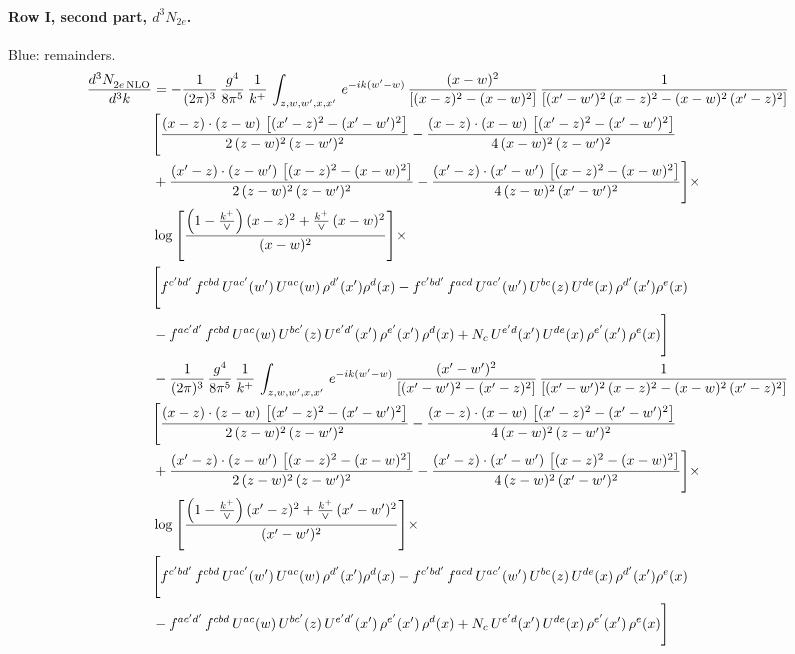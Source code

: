 \documentclass[10pt]{article}
\numberwithin{equation}{section}
\newcommand{\new}[1]{{\color{blue}#1}}
\begin{document}
\paragraph{Row I, second part, $d^3N_{2e}$.}
\new{Blue}: remainders.
\begin{align}
 \frac{d^{3}N_{2e\,\rm NLO}^{\rm}}{d^{3}k}  & =   -\frac{1}{(2\pi)^{3}}\, \frac{g^{4}}{8\pi^{5}}\,\frac{1}{k^{+}}\,\int_{z,w,w^{\prime},x,x'}\, e^{-ik(w^{\prime}-w)}\,\frac{(x-w)^{2}}{\left[(x-z)^{2}-(x-w)^{2}\right]}\, \frac{1}{\left[(x'-w')^{2}\, (x-z)^{2} - (x-w)^{2}\, (x'-z)^{2}\right]} \notag \\ & \Bigg[\frac{(x-z)\cdot (z-w)\, \left[(x'-z)^{2}-(x'-w')^{2}\right]}{2\, (z-w)^{2}\, (z-w')^{2}}  - \frac{(x-z)\cdot (x-w)\,\left[(x'-z)^{2}-(x'-w')^{2}\right] }{4\,(x-w)^{2}\,(z-w')^{2}}\notag \\ & +\frac{(x'-z)\cdot (z-w')\, \left[(x-z)^{2}-(x-w)^{2}\right]}{2\, (z-w)^{2}\, (z-w')^{2}}-\frac{(x'-z)\cdot (x'-w')\, \left[(x-z)^{2}-(x-w)^{2}\right]}{4\, (z-w)^{2}\,(x'-w')^{2}}\Bigg]\times\,\notag \\ & \log{\left[\frac{\left(1-\frac{k^{+}}{\vee}\right)(x-z)^{2}+\frac{k^{+}}{\vee}\,(x-w)^{2}}{(x-w)^{2}}\right]}\times\,\notag \\ & \Bigg[f^{c'bd'}\,f^{cbd}\, U^{ac'}(w')\,U^{ac}(w)\,\rho^{d'}(x')\rho^{d}(x)- f^{c'bd'}\,f^{acd}\,U^{ac'}(w')\,U^{bc}(z)\,U^{de}(x)\,\rho^{d'}(x')\rho^{e}(x) \notag \\ & -f^{ac'd'}\,f^{cbd}\,U^{ac}(w)\,U^{bc'}(z)\,U^{e'd'}(x')\,\rho^{e'}(x')\,\rho^{d}(x) +N_{c}\,U^{e'd}(x')\,U^{de}(x)\,\rho^{e'}(x')\,\rho^{e}(x)\Bigg] \notag \\
& -\frac{1}{(2\pi)^{3}}\, \frac{g^{4}}{8\pi^{5}}\,\frac{1}{k^{+}}\,\int_{z,w,w^{\prime},x,x'}\, e^{-ik(w^{\prime}-w)}\, \frac{(x'-w')^{2}}{\left[(x'-w')^{2}-(x'-z)^{2}\right]}\, \frac{1}{\left[(x'-w')^{2}\, (x-z)^{2} - (x-w)^{2}\, (x'-z)^{2}\right]}  \notag \\ & \Bigg[\frac{(x-z)\cdot (z-w)\, \left[(x'-z)^{2}-(x'-w')^{2}\right]}{2\, (z-w)^{2}\, (z-w')^{2}}  - \frac{(x-z)\cdot (x-w)\,\left[(x'-z)^{2}-(x'-w')^{2}\right] }{4\,(x-w)^{2}\,(z-w')^{2}}\notag \\ & +\frac{(x'-z)\cdot (z-w')\, \left[(x-z)^{2}-(x-w)^{2}\right]}{2\, (z-w)^{2}\, (z-w')^{2}}-\frac{(x'-z)\cdot (x'-w')\, \left[(x-z)^{2}-(x-w)^{2}\right]}{4\, (z-w)^{2}\,(x'-w')^{2}}\Bigg]\times\,\notag \\ & \log{\left[\frac{\left(1-\frac{k^{+}}{\vee}\right)(x'-z)^{2}+\frac{k^{+}}{\vee}\,(x'-w')^{2}}{(x'-w')^{2}}\right]}\times\notag \\ & \Bigg[f^{c'bd'}\,f^{cbd}\, U^{ac'}(w')\,U^{ac}(w)\,\rho^{d'}(x')\rho^{d}(x)- f^{c'bd'}\,f^{acd}\,U^{ac'}(w')\,U^{bc}(z)\,U^{de}(x)\,\rho^{d'}(x')\rho^{e}(x) \notag \\ & -f^{ac'd'}\,f^{cbd}\,U^{ac}(w)\,U^{bc'}(z)\,U^{e'd'}(x')\,\rho^{e'}(x')\,\rho^{d}(x) +N_{c}\,U^{e'd}(x')\,U^{de}(x)\,\rho^{e'}(x')\,\rho^{e}(x)\Bigg] \label{eq:F:G2I2e}
\end{align}
\end{document}
